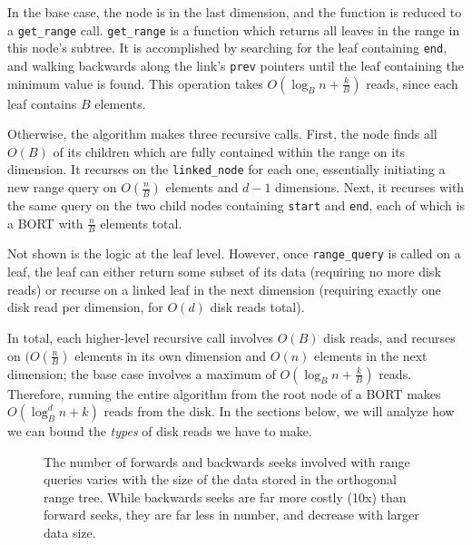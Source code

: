 \documentclass[11pt, oneside]{article}
\newcommand{\ms}{\texttt}
\begin{document}
In the base case, the node is in the last dimension, and the function is reduced
to a \ms{get\_range} call. \ms{get\_range} is a function which returns all
leaves in the range in this node's subtree. It is accomplished by searching for
the leaf containing \ms{end}, and walking backwards along the link's \ms{prev}
pointers until the leaf containing the minimum value is found. This operation
takes $O(\log_B n + \frac{k}{B})$ reads, since each leaf contains $B$ elements.

Otherwise, the algorithm makes three recursive calls. First, the node finds all
$O(B)$ of its children which are fully contained within the range on its
dimension. It recurses on the \ms{linked\_node} for each one, essentially
initiating a new range query on $O(\frac{n}{B})$ elements and $d - 1$
dimensions. Next, it recurses with the same query on the two child nodes
containing \ms{start} and \ms{end}, each of which is a BORT with $\frac{n}{B}$
elements total.

Not shown is the logic at the leaf level. However, once \ms{range\_query} is
called on a leaf, the leaf can either return some subset of its data (requiring
no more disk reads) or recurse on a linked leaf in the next dimension (requiring
exactly one disk read per dimension, for $O(d)$ disk reads total).

In total, each higher-level recursive call involves $O(B)$ disk reads, and
recurses on $(O(\frac{n}{B})$ elements in its own dimension and $O(n)$ elements
in the next dimension; the base case involves a maximum of $O(\log_B n +
\frac{k}{B})$ reads. Therefore, running the entire algorithm from the root node
of a BORT makes $O(\log_B^d n + k)$ reads from the disk. In the sections below,
we will analyze how we can bound the \textit{types} of disk reads we have to
make.

\begin{figure}[b!]
\centering
{}%
\caption{The number of forwards and backwards seeks involved with range queries varies with the size of the data stored in the orthogonal range tree. While backwards seeks are far more costly (10x) than forward seeks, they are far less in number, and decrease with larger data size.}
\label{fig:figure2}
\end{figure}
\end{document}
